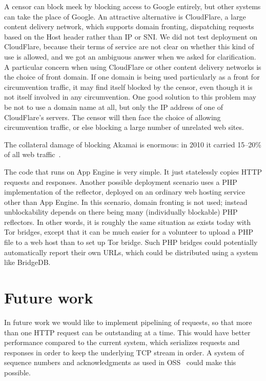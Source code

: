 \documentclass[conference]{IEEEtran}
\begin{document}
A censor can block meek by blocking access to Google entirely,
but other systems can take the place of Google.
An attractive alternative is CloudFlare, a large content delivery network,
which supports domain fronting, dispatching requests based on the Host header
rather than IP or SNI.
We did not test deployment on CloudFlare,
because their terms of service are not clear on whether this kind of use is allowed,
and we got an ambiguous answer when we asked for clarification.
A particular concern when using CloudFlare or other content delivery networks is the choice of front domain.
If one domain is being used particularly as a front for circumvention traffic,
it may find itself blocked by the censor, even though it is not itself
involved in any circumvention.
One good solution to this problem may be not to use a domain name at all,
but only the IP address of one of CloudFlare's servers.
The censor will then face the choice of allowing circumvention traffic,
or else blocking a large number of unrelated web sites.


The collateral damage of blocking Akamai is enormous: in 2010 it carried 15--20\% of all web traffic~\cite{akamai}.

The code that runs on App Engine is very simple.
It just statelessly copies HTTP requests and responses.
Another possible deployment scenario uses a PHP implementation of the reflector,
deployed on an ordinary web hosting service other than App Engine.
In this scenario, domain fronting is not used;
instead unblockability depends on there being many (individually blockable) PHP reflectors.
In other words, it is roughly the same situation as exists today with Tor bridges,
except that it can be much easier for a volunteer to upload a PHP file to a web host
than to set up Tor bridge.
Such PHP bridges could potentially automatically report their own URLs,
which could be distributed using a system like BridgeDB.


\section{Future work}

In future work we would like to implement pipelining of requests,
so that more than one HTTP request can be outstanding at a time.
This would have better performance compared to the current system,
which serializes requests and responses in order to keep the
underlying TCP stream in order.
A system of sequence numbers and acknowledgments as used in OSS~\cite{oss}
could make this possible.
\end{document}
